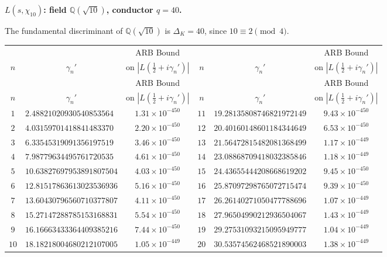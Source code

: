 \documentclass[12pt,reqno]{amsart}
\theoremstyle{plain}
\theoremstyle{definition}
\theoremstyle{remark}
\newcommand{\Q}{\mathbb{Q}}
\begin{document}
\medskip\noindent\textbf{$L(s,\chi_{10})$: field $\Q(\sqrt{10})$, conductor $q=40$.}\par\smallskip
\label{app:chi40-zeros}

The fundamental discriminant of $\Q(\sqrt{10})$ is $\Delta_K = 40$, since $10 \equiv 2 \pmod{4}$.

\renewcommand{\arraystretch}{1.05}\footnotesize
\begin{longtable}{clc|clc}
\toprule
 & & \multicolumn{1}{c}{ARB Bound} &
 & & \multicolumn{1}{c}{ARB Bound} \\
$n$ & \multicolumn{1}{c}{$\gamma_n'$} & \multicolumn{1}{c}{on $|L(\tfrac{1}{2}+i\gamma_n')|$} &
$n$ & \multicolumn{1}{c}{$\gamma_n'$} & \multicolumn{1}{c}{on $|L(\tfrac{1}{2}+i\gamma_n')|$} \\
\midrule
\endfirsthead
\toprule
 & & \multicolumn{1}{c}{ARB Bound} &
 & & \multicolumn{1}{c}{ARB Bound} \\
$n$ & \multicolumn{1}{c}{$\gamma_n'$} & \multicolumn{1}{c}{on $|L(\tfrac{1}{2}+i\gamma_n')|$} &
$n$ & \multicolumn{1}{c}{$\gamma_n'$} & \multicolumn{1}{c}{on $|L(\tfrac{1}{2}+i\gamma_n')|$} \\
\midrule
\endhead
\bottomrule
\endlastfoot
$1$ & $2.48821020930540853564$ & $1.31 \times 10^{-450}$ & $11$ & $19.28135808746821972149$ & $9.43 \times 10^{-450}$ \\
$2$ & $4.03159701418841483370$ & $2.20 \times 10^{-450}$ & $12$ & $20.40160148601184344649$ & $6.53 \times 10^{-450}$ \\
$3$ & $6.33545319091356197519$ & $3.46 \times 10^{-450}$ & $13$ & $21.56472815482081368499$ & $1.17 \times 10^{-449}$ \\
$4$ & $7.98779634495761720535$ & $4.61 \times 10^{-450}$ & $14$ & $23.08868709418032385846$ & $1.18 \times 10^{-449}$ \\
$5$ & $10.63827697953891807504$ & $4.03 \times 10^{-450}$ & $15$ & $24.43655444208668619202$ & $9.45 \times 10^{-450}$ \\
$6$ & $12.81517863613023536936$ & $5.16 \times 10^{-450}$ & $16$ & $25.87097298765072715474$ & $9.39 \times 10^{-450}$ \\
$7$ & $13.60430796560710377807$ & $4.11 \times 10^{-450}$ & $17$ & $26.26140271050477788696$ & $1.07 \times 10^{-449}$ \\
$8$ & $15.27147288785153168831$ & $5.54 \times 10^{-450}$ & $18$ & $27.96504990212936504067$ & $1.43 \times 10^{-449}$ \\
$9$ & $16.16663433364409385216$ & $7.44 \times 10^{-450}$ & $19$ & $29.27531093215095949777$ & $1.04 \times 10^{-449}$ \\
$10$ & $18.18218004680212107005$ & $1.05 \times 10^{-449}$ & $20$ & $30.53574562468521890003$ & $1.38 \times 10^{-449}$ \\

\end{longtable}
\normalsize
\end{document}
